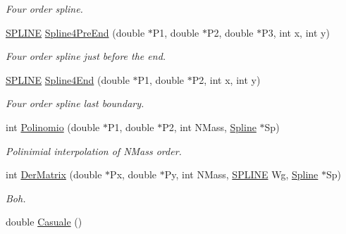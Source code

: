 \begin{DoxyCompactItemize}
\begin{DoxyCompactList}\small\item\em Four order spline. \end{DoxyCompactList}\item 
\hyperlink{structSPLINE}{S\+P\+L\+I\+NE} \hyperlink{classMatematica_a0b3e535c3c50459ad85fbb27d8ab0ca3}{Spline4\+Pre\+End} (double $\ast$P1, double $\ast$P2, double $\ast$P3, int x, int y)\hypertarget{classMatematica_a0b3e535c3c50459ad85fbb27d8ab0ca3}{}\label{classMatematica_a0b3e535c3c50459ad85fbb27d8ab0ca3}

\begin{DoxyCompactList}\small\item\em Four order spline just before the end. \end{DoxyCompactList}\item 
\hyperlink{structSPLINE}{S\+P\+L\+I\+NE} \hyperlink{classMatematica_a13fad8c692fb52f3ccd8a5f47b7db2cb}{Spline4\+End} (double $\ast$P1, double $\ast$P2, int x, int y)\hypertarget{classMatematica_a13fad8c692fb52f3ccd8a5f47b7db2cb}{}\label{classMatematica_a13fad8c692fb52f3ccd8a5f47b7db2cb}

\begin{DoxyCompactList}\small\item\em Four order spline last boundary. \end{DoxyCompactList}\item 
int \hyperlink{classMatematica_a4811dba3bc03279d94c49e2a480dae4f}{Polinomio} (double $\ast$P1, double $\ast$P2, int N\+Mass, \hyperlink{classSpline}{Spline} $\ast$Sp)\hypertarget{classMatematica_a4811dba3bc03279d94c49e2a480dae4f}{}\label{classMatematica_a4811dba3bc03279d94c49e2a480dae4f}

\begin{DoxyCompactList}\small\item\em Polinimial interpolation of  N\+Mass order. \end{DoxyCompactList}\item 
int \hyperlink{classMatematica_a27b793e32b1410383bacb44d0233ee86}{Der\+Matrix} (double $\ast$Px, double $\ast$Py, int N\+Mass, \hyperlink{structSPLINE}{S\+P\+L\+I\+NE} Wg, \hyperlink{classSpline}{Spline} $\ast$Sp)\hypertarget{classMatematica_a27b793e32b1410383bacb44d0233ee86}{}\label{classMatematica_a27b793e32b1410383bacb44d0233ee86}

\begin{DoxyCompactList}\small\item\em Boh. \end{DoxyCompactList}\item 
double \hyperlink{classMatematica_a953e8be14f6a9c259f192683f3a5a970}{Casuale} ()\hypertarget{classMatematica_a953e8be14f6a9c259f192683f3a5a970}{}\label{classMatematica_a953e8be14f6a9c259f192683f3a5a970}


\end{DoxyCompactItemize}
